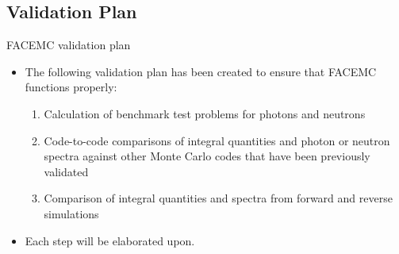 \documentclass{beamer}
\begin{document}
\subsection{Validation Plan}
\begin{frame}{FACEMC validation plan}

  \begin{itemize}
    \item The following validation plan has been created to ensure that FACEMC
      functions properly:
      \begin{enumerate}
        \item Calculation of benchmark test problems for photons and neutrons
        \item Code-to-code comparisons of integral quantities and photon or 
          neutron spectra against other Monte Carlo codes that have been 
          previously validated
        \item Comparison of integral quantities and spectra from forward and 
          reverse simulations
      \end{enumerate}
    \item Each step will be elaborated upon.
  \end{itemize}

\end{frame}
\end{document}
